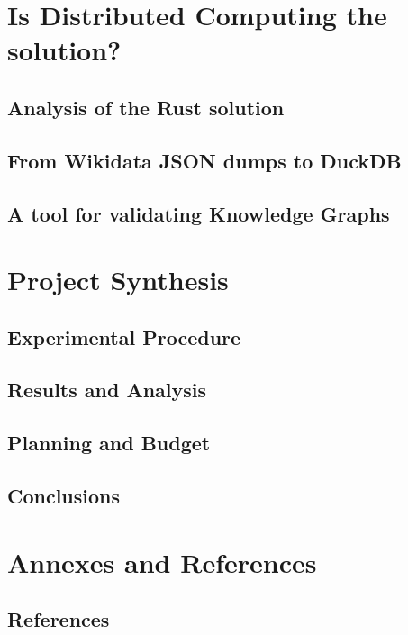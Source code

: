 \documentclass{legrand}
\begin{document}
\part{Is Distributed Computing the solution?}

\chapter{Analysis of the Rust solution}
\label{chapter:analysis}


\chapter{From Wikidata JSON dumps to DuckDB}
\label{chapter:wd2duckdb}


\chapter{A tool for validating Knowledge Graphs}
\label{chapter:pschema}


\part{Project Synthesis}

\chapter{Experimental Procedure}
\label{chapter:experiment}


\chapter{Results and Analysis}
\label{chapter:results}


\chapter{Planning and Budget}
\label{chapter:planning}


\chapter{Conclusions}
\label{chapter:conclusions}


\part{Annexes and References}

\chapter{References} %
\printbibliography[heading=bibempty]
\end{document}
